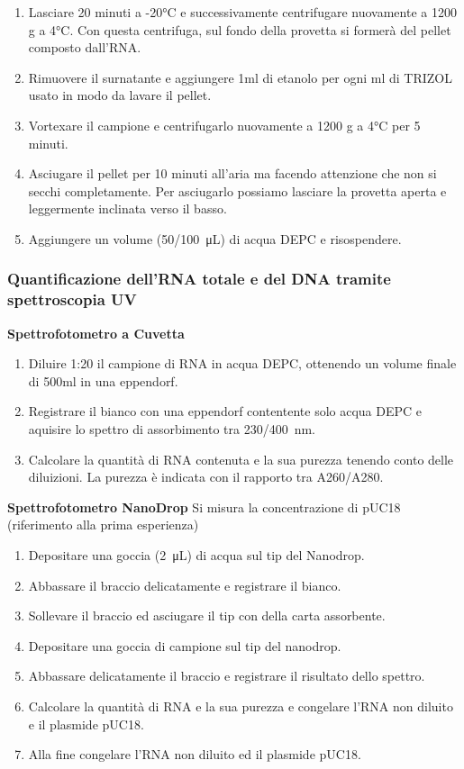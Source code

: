 \begin{enumerate}
\item Lasciare 20 minuti a -20°C e successivamente centrifugare nuovamente a 1200 g a 4°C. Con questa centrifuga, sul fondo della provetta si formerà del pellet composto dall’RNA.
	
\item Rimuovere il surnatante e aggiungere 1ml di etanolo per ogni ml di TRIZOL usato in modo da lavare il pellet.

\item Vortexare il campione e centrifugarlo nuovamente a 1200 g a 4°C per 5 minuti.

\item Asciugare il pellet per 10 minuti all’aria ma facendo attenzione che non si secchi completamente. Per asciugarlo possiamo lasciare la provetta aperta e leggermente inclinata verso il basso.

\item Aggiungere un volume (\SI{50/100}{\micro\liter}) di acqua DEPC e risospendere.
\end{enumerate}

\subsubsection{Quantificazione dell’RNA totale e del DNA tramite spettroscopia UV}

\textbf{Spettrofotometro a Cuvetta}
\vspace{0.5cm}

\begin{enumerate}
\item  Diluire 1:20 il campione di RNA in acqua DEPC, ottenendo un volume finale di 500ml in una eppendorf.
\item  Registrare il bianco con una eppendorf contentente solo acqua DEPC e aquisire lo spettro di assorbimento tra \SI{230/400}{\nano\meter}.
\item  Calcolare la quantità di RNA contenuta e la sua purezza tenendo conto delle diluizioni. La purezza è indicata con il rapporto tra A260/A280.
\end{enumerate}

\textbf{Spettrofotometro NanoDrop}
\vspace{0.5cm}
Si misura la concentrazione di pUC18 (riferimento alla prima esperienza)
\begin{enumerate}
\item Depositare una goccia (\SI{2}{\micro\liter}) di acqua sul tip del Nanodrop.
\item  Abbassare il braccio delicatamente e registrare il bianco.
\item  Sollevare il braccio ed asciugare il tip con della carta assorbente.
\item  Depositare una goccia di campione sul tip del nanodrop.
\item  Abbassare delicatamente il braccio e registrare il risultato dello spettro.
\item  Calcolare la quantità di RNA e la sua purezza e congelare l’RNA non diluito e il plasmide pUC18.
\item Alla fine congelare l'RNA non diluito ed il plasmide pUC18.
\end{enumerate}


